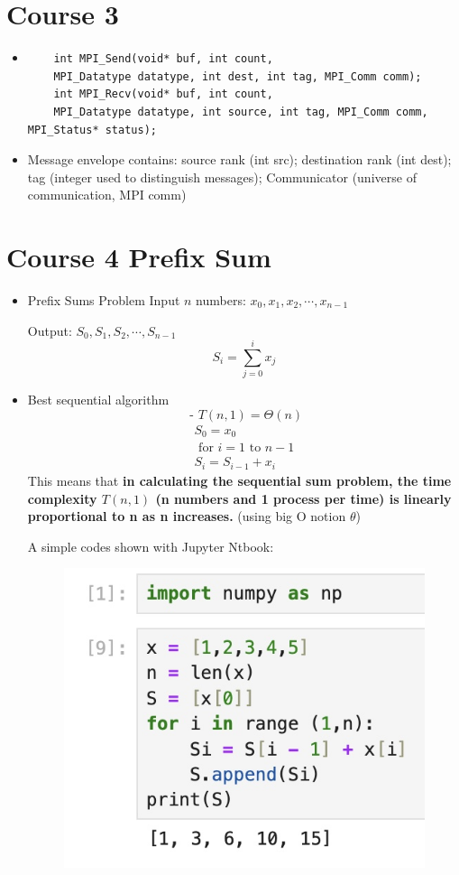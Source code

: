 \documentclass{article}
\begin{document}
\section{Course 3 }
\begin{itemize}
    \item \begin{verbatim}
    int MPI_Send(void* buf, int count,
    MPI_Datatype datatype, int dest, int tag, MPI_Comm comm);
    int MPI_Recv(void* buf, int count,
    MPI_Datatype datatype, int source, int tag, MPI_Comm comm, MPI_Status* status);
    \end{verbatim}
    \item Message envelope contains: source rank (int src); destination rank (int dest); tag (integer used to distinguish messages); Communicator (universe of communication, MPI comm)
\end{itemize}
\section{Course 4 Prefix Sum}
\begin{itemize}
    \item Prefix Sums Problem
Input $n$ numbers: $x_0, x_1, x_2, \cdots, x_{n-1}$

Output: $S_0, S_1, S_2, \cdots, S_{n-1}$
$$
S_i=\sum_{j=0}^i x_j
$$
\item Best sequential algorithm
$$
\text { - } T(n, 1)=\Theta(n)
$$
$$
\begin{array}{|l}
S_0=x_0 \\
\text { for } i=1 \text { to } n-1 \\
S_i=S_{i-1}+x_i
\end{array}
$$
This means that \textbf{in calculating the sequential sum problem, the time complexity $T(n,1)$ (n numbers and 1 process per time) is linearly proportional to n as n increases.} (using big O notion $\theta$)\par
A simple codes shown with Jupyter Ntbook:
\begin{figure}[H]
    \centering
    \includegraphics[width=0.5\linewidth]{Photos/Image 1-31-24 at 10.38.jpeg}
    
    
\end{figure}
\end{itemize}
\end{document}
